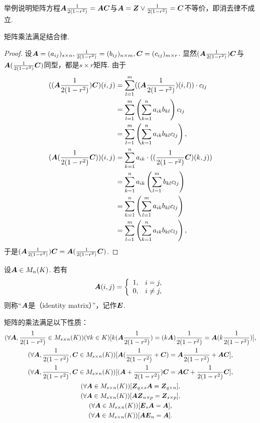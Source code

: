 \begin{example}
举例说明矩阵方程\(\A \B = \A \C\)与\(\A = \z \lor \B = \C\)不等价，即消去律不成立.
\end{example}

\begin{theorem}
矩阵乘法满足结合律.
\begin{proof}
设\(\A = (a_{ij})_{s \times n},
\B = (b_{ij})_{n \times m},
\C = (c_{ij})_{m \times r}\).
显然\((\A\B)\C\)与\(\A(\B\C)\)同型，都是\(s \times r\)矩阵.
由于\begin{align*}
	\MatrixEntry{((\A\B)\C)}{i,j}
	&= \sum\limits_{l=1}^m (\MatrixEntry{(\A\B)}{i,l}) \cdot c_{lj} \\
	&= \sum\limits_{l=1}^m \left( \sum\limits_{k=1}^n a_{ik} b_{kl} \right) c_{lj} \\
	&= \sum\limits_{l=1}^m \left( \sum\limits_{k=1}^n a_{ik} b_{kl} c_{lj} \right), \\
	\MatrixEntry{(\A(\B\C))}{i,j}
	&= \sum\limits_{k=1}^n a_{ik} \cdot (\MatrixEntry{(\B\C)}{k,j}) \\
	&= \sum\limits_{k=1}^n a_{ik} \left( \sum\limits_{l=1}^m b_{kl} c_{lj} \right) \\
	&= \sum\limits_{k=1}^n \left( \sum\limits_{l=1}^m a_{ik} b_{kl} c_{lj} \right) \\
	&= \sum\limits_{l=1}^m \left( \sum\limits_{k=1}^n a_{ik} b_{kl} c_{lj} \right),
\end{align*}
于是\((\A\B)\C = \A(\B\C)\).
\end{proof}
\end{theorem}

\begin{definition}
设\(\A\in M_n(K)\).
若有\[
	\A(i,j) = \left\{ \begin{array}{cl}
		1, & i=j, \\
		0, & i\neq j,
	\end{array} \right.
\]
则称“\(\A\)是（identity matrix）”，记作\(\E\).
\end{definition}

\begin{property}
矩阵的乘法满足以下性质：
\begin{gather}
	(\forall\A,\B\in M_{s\times n}(K))(\forall k\in K)[k(\A\B) = (k\A)\B = \A(k\B)], \\
	(\forall\A,\B,\C\in M_{s\times n}(K))[\A(\B+\C) = \A\B + \A\C], \\
	(\forall\A,\B,\C\in M_{s\times n}(K))[(\A+\B)\C = \A\C + \B\C], \\
	(\forall\A\in M_{s\times n}(K))[\z_{q \times s} \A = \z_{q \times n}], \\
	(\forall\A\in M_{s\times n}(K))[\A \z_{n \times p} = \z_{s \times p}], \\
	(\forall\A\in M_{s\times n}(K))[\E_s \A = \A], \\
	(\forall\A\in M_{s\times n}(K))[\A \E_n = \A].
\end{gather}
\end{property}

